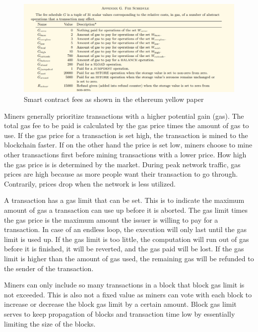 \begin{figure}[ht!]
  \begin{center}
    \includegraphics[scale=0.6]{Talk7/img/smart_contracts/gas-fees}
  \end{center}
  \caption{Smart contract fees as shown in the ethereum yellow paper}
  \label{fig:smart_contract_fees}
\end{figure}

Miners generally prioritize transactions with a higher potential gain (gas). The total gas fee to be paid is calculated by the gas price times the amount of gas to use. If the gas price for a transaction is set high, the transaction is mined to the blockchain faster. If on the other hand the price is set low, miners choose to mine other transactions first before mining transactions with a lower price. How high the gas price is is determined by the market. During peak network traffic, gas prices are high because as more people want their transaction to go through. Contrarily, prices drop when the network is less utilized.

A transaction has a gas limit that can be set. This is to indicate the maximum amount of gas a transaction can use up before it is aborted. The gas limit times the gas price is the maximum amount the issuer is willing to pay for a transaction. In case of an endless loop, the execution will only last until the gas limit is used up.
If the gas limit is too little, the computation will run out of gas before it is finished, it will be reverted, and the gas paid will be lost. If the gas limit is higher than the amount of gas used, the remaining gas will be refunded to the sender of the transaction.

Miners can only include so many transactions in a block that block gas limit is not exceeded. This is also not a fixed value as miners can vote with each block to increase or decrease the block gas limit by a certain amount. Block gas limit serves to keep propagation of blocks and transaction time low by essentially limiting the size of the blocks.

